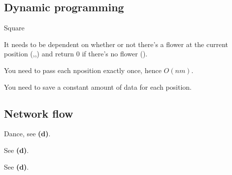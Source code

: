 \documentclass[a4paper]{article}
\newenvironment{task}[1]
{
	\begin{description}[align=right]
		\item [#1]
}{		%
	\end{description}
}
\newcommand{\taskref}[1]{\textbf{#1}}
\DeclareMathOperator{\*}{\cdot}
\begin{document}
\subsection*{Dynamic programming}

\begin{task}{7. (a)}
	 Square
\end{task}

\begin{task}{(b)}
	 It needs to be dependent on whether or not there's a flower at the current position (,,) and return 0 if there's no flower ().
\end{task}

\begin{task}{(c)}
	 You need to pass each nposition exactly once, hence $O(nm)$.
\end{task}

\begin{task}{(d)}
	 You need to save a constant amount of data for each position.
\end{task}

\subsection*{Network flow}

\begin{task}{8. (a)}
	 Dance, see \taskref{(d)}.
\end{task}

\begin{task}{(b)}
	 See \taskref{(d)}.
\end{task}

\begin{task}{(c)}
	 See \taskref{(d)}.
\end{task}
\end{document}
